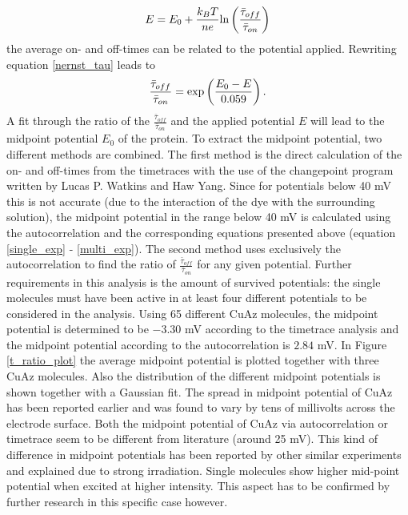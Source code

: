 \documentclass[twoside,single]{lion-msc}
\begin{document}
\begin{equation}\label{nernst_tau}
E = E_{0}+\frac{k_{B}T}{ne}\textup{ln}\left ( \frac{\bar{\tau}_{off}}{\bar{\tau}_{on}} \right )
\end{equation}
the average on- and off-times can be related to the potential applied. Rewriting equation \ref{nernst_tau} leads to
\begin{equation}\label{fit_onoff}
\frac{\bar{\tau}_{off}}{\bar{\tau}_{on}} = \textup{exp}\left ( \frac{E_{0}-E}{0.059} \right ).
\end{equation}
A fit through the ratio of the $\frac{\bar{\tau}_{off}}{\bar{\tau}_{on}}$ and the applied potential $E$ will lead to the midpoint potential $E_{0}$ of the protein. To extract the midpoint potential, two different methods are combined. The first method is the direct calculation of the on- and off-times from the timetraces with the use of the changepoint program written by  Lucas P. Watkins and Haw Yang. Since for potentials below 40 mV this is not accurate (due to the interaction of the dye with the surrounding solution), the midpoint potential in the range below 40 mV is calculated using the autocorrelation and the corresponding equations presented above (equation \ref{single_exp} - \ref{multi_exp}). The second method uses exclusively the autocorrelation to find the ratio of  $\frac{\bar{\tau}_{off}}{\bar{\tau}_{on}}$ for any given potential. Further requirements in this analysis is the amount of survived potentials: the single molecules must have been active in at least four different potentials to be considered in the analysis. Using 65 different CuAz molecules, the midpoint potential is determined to be $-3.30$ mV according to the timetrace analysis and the midpoint potential according to the autocorrelation is $2.84$ mV. In Figure \ref{t_ratio_plot} the average midpoint potential is plotted together with three CuAz molecules. Also the distribution of the different midpoint potentials is shown together with a Gaussian fit. The spread in midpoint potential of CuAz has been reported earlier \cite{Salverda2010} and was found to vary by tens of millivolts across the electrode surface.  Both the midpoint potential of CuAz via autocorrelation or timetrace seem to be different from literature (around 25 mV). This kind of difference in midpoint potentials has been reported by other similar experiments \cite{Zhang2017} and explained due to strong irradiation. Single molecules show higher mid-point potential when excited at higher intensity. This aspect has to be confirmed by further research in this specific case however. 
\end{document}

